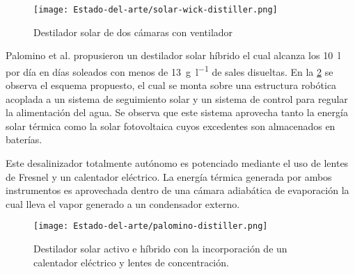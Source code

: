 	\begin{figure}[H]
		\centering
		\texttt{[image: Estado-del-arte/solar-wick-distiller.png]}
		\caption{Destilador solar de dos cámaras con ventilador}
		\label{fig:solar-wick-distiller}
	\end{figure}
	
	Palomino et al. \cite{palomino-resendiz_design_2018} propusieron un destilador solar híbrido el cual alcanza los \SI{10}{\litre} por día en días soleados con menos de \SI{13}{\gram\per\litre} de sales disueltas. En la \cref{fig:palomino-distiller} se observa el esquema propuesto, el cual se monta sobre una estructura robótica acoplada a un sistema de seguimiento solar y un sistema de control para regular la alimentación del agua. Se observa que este sistema aprovecha tanto la energía solar térmica como la solar fotovoltaica cuyos excedentes son almacenados en baterías.
	
	Este desalinizador totalmente autónomo es potenciado mediante el uso de lentes de Fresnel y un calentador eléctrico. La energía térmica generada por ambos instrumentos es aprovechada dentro de una cámara adiabática de evaporación la cual lleva el vapor generado a un condensador externo.
	
	\begin{figure}[H]
		\centering
		\texttt{[image: Estado-del-arte/palomino-distiller.png]}
		\caption{Destilador solar activo e híbrido con la incorporación de un calentador eléctrico y lentes de concentración.}
		\label{fig:palomino-distiller}
	\end{figure}